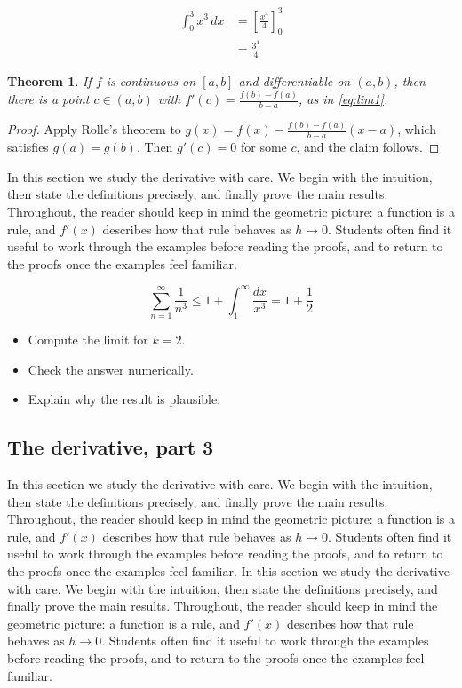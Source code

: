 \documentclass[11pt]{article}
\newtheorem{theorem}{Theorem}[section]
\begin{document}
\begin{align}
  \int_0^{3} x^{3}\,dx &= \left[ \frac{x^{4}}{4} \right]_0^{3} \\
  &= \frac{3^{4}}{4} \label{eq:int1}
\end{align}

\begin{theorem}
If $f$ is continuous on $[a,b]$ and differentiable on $(a,b)$, then there is a point $c \in (a,b)$ with $f'(c) = \frac{f(b)-f(a)}{b-a}$, as in \eqref{eq:lim1}.
\end{theorem}

\begin{proof}
Apply Rolle's theorem to $g(x) = f(x) - \frac{f(b)-f(a)}{b-a}(x-a)$, which satisfies $g(a) = g(b)$. Then $g'(c) = 0$ for some $c$, and the claim follows.
\end{proof}

In this section we study the derivative with care. We begin with the intuition, then state the definitions precisely, and finally prove the main results. Throughout, the reader should keep in mind the geometric picture: a function is a rule, and $f'(x)$ describes how that rule behaves as $h \to 0$. Students often find it useful to work through the examples before reading the proofs, and to return to the proofs once the examples feel familiar. 

\[
  \sum_{n=1}^{\infty} \frac{1}{n^{3}} \le 1 + \int_1^{\infty} \frac{dx}{x^{3}} = 1 + \frac{1}{2}
\]

\begin{itemize}
  \item Compute the limit for $k = 2$.
  \item Check the answer numerically.
  \item Explain why the result is plausible.
\end{itemize}

\subsection{The derivative, part 3}

In this section we study the derivative with care. We begin with the intuition, then state the definitions precisely, and finally prove the main results. Throughout, the reader should keep in mind the geometric picture: a function is a rule, and $f'(x)$ describes how that rule behaves as $h \to 0$. Students often find it useful to work through the examples before reading the proofs, and to return to the proofs once the examples feel familiar. In this section we study the derivative with care. We begin with the intuition, then state the definitions precisely, and finally prove the main results. Throughout, the reader should keep in mind the geometric picture: a function is a rule, and $f'(x)$ describes how that rule behaves as $h \to 0$. Students often find it useful to work through the examples before reading the proofs, and to return to the proofs once the examples feel familiar. 
\end{document}

